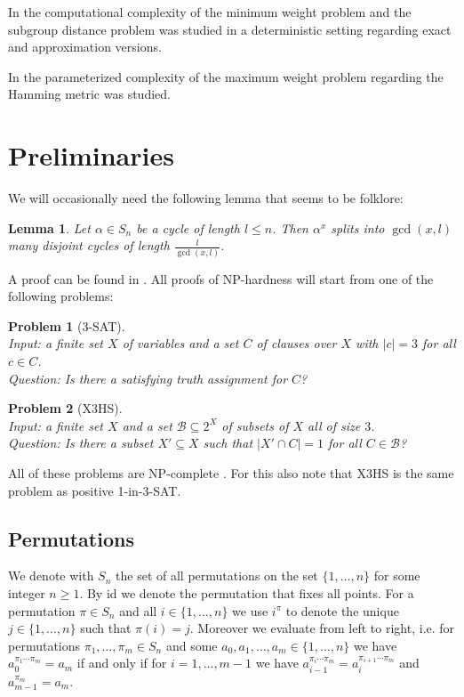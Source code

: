 \documentclass{article}
\newtheorem{lemma}{Lemma}
\newtheorem{problem}{Problem}
\begin{document}
In \cite{arvind} the computational complexity of the minimum weight problem and the subgroup distance problem was studied in a deterministic setting regarding exact and approximation versions.

In \cite{arvind2} the parameterized complexity of the maximum weight problem regarding the Hamming metric was studied.

\section{Preliminaries}
We will occasionally need the following lemma that seems to be folklore:
\begin{lemma}\label{lemmasplit}
Let $\alpha \in S_n$ be a cycle of length $l \leq n$. Then $\alpha^x$ splits into $\gcd(x,l)$ many disjoint cycles of length $\frac{l}{\gcd(x,l)}$.
\end{lemma}
A proof can be found in \cite{lohrey}. All proofs of {\sf NP}-hardness will start from one of the following problems:
\begin{problem}[\textsf{3-SAT}]~\\
Input: a finite set $X$ of variables and a set $C$ of clauses over $X$ with $|c| = 3$ for all $c \in C$.\\
Question: Is there a satisfying truth assignment for $C$?
\end{problem}
\begin{problem}[\textsf{X3HS}]~\\
Input: a finite set $X$ and a set $\mathcal{B} \subseteq 2^X$ of subsets of $X$ all of size $3$.\\
Question: Is there a subset $X' \subseteq X$ such that $|X' \cap C| = 1$ for all $C \in \mathcal{B}$?
\end{problem}
All of these problems are {\sf NP}-complete \cite{gareyjohnson}. For this also note that \textsf{X3HS} is the same problem as positive \textsf{1-in-3-SAT}.

\subsection{Permutations}
We denote with $S_n$ the set of all permutations on the set $\{1,\dots,n\}$ for some integer $n \geq 1$. By $\mathrm{id}$ we denote the permutation that fixes all points. For a permutation $\pi \in S_n$ and all $i \in \{1,\dots,n\}$ we use $i^\pi$ to denote the unique $j \in \{1,\dots,n\}$ such that $\pi(i) = j$. Moreover we evaluate from left to right, i.e. for permutations $\pi_1,\dots,\pi_m \in S_n$ and some $a_0,a_1,\dots,a_m \in \{1,\dots,n\}$ we have $a_0^{\pi_1 \cdots \pi_m} = a_m$ if and only if for $i=1,\dots,m-1$ we have $a_{i-1}^{\pi_i \cdots \pi_m} = a_i^{\pi_{i+1} \cdots \pi_m}$ and $a_{m-1}^{\pi_m} = a_m$.
\end{document}
